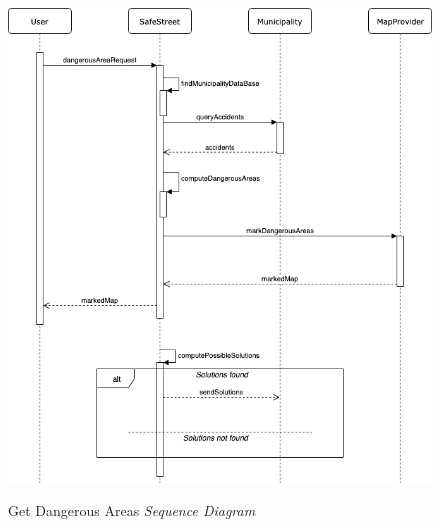 \documentclass[../RASD.tex]{subfiles}
\begin{document}
                \begin{figure}[H]
                    \centering
                    \includegraphics[scale = 2]{assets/getDangerousAreasSD.png}\\[1.6 cm]
                    \caption[Get Dangerous Areas \textit{Sequence Diagram}]{Get Dangerous Areas \textit{Sequence Diagram}}
                \end{figure}
\end{document}
